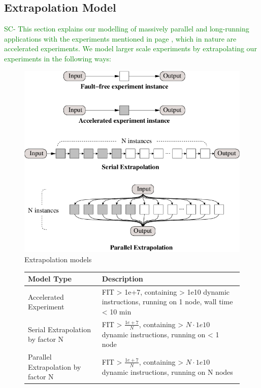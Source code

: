 \documentclass{sig-alternate}
\newcommand{\sui}[1]{%
  \textcolor{green}{SC-#1}
}
\begin{document}
{\subsection{Extrapolation Model}
\label{sec:eval:extrapolation}
\sui{
This section explains our modelling of massively parallel and long-running applications with the experiments mentioned in page \pageref{sec:eval}, which in nature
are accelerated experiments. We model larger scale experiments by extrapolating our experiments in the following ways:\\
}


\begin{figure}[ht!]
\centering
\includegraphics[width=1.00\columnwidth]{figs/extrapolates.png}
\caption{Extrapolation models}
\label{fig:extrapolations}
\end{figure}

\begin{figure}[ht!]
\centering
\begin{tabular}{|p{1.0in}|p{2.0in}|}
\hline
 Model Type & Description \\
\hline
Accelerated Experiment & FIT > 1e+7, containing > 1e10 dynamic instructions, running on 1 node, wall time < 10 min \\
\hline
Serial Extrapolation by factor N & FIT > $\frac{1e+7}{N}$, containing > $N \cdot 1e10$ dynamic instructions, running on < 1 node \\
\hline
Parallel Extrapolation by factor N & FIT > $\frac{1e+7}{N}$, containing > $N \cdot 1e10$ dynamic instructions, running on N nodes \\
\hline
\end{tabular}
\end{figure}

}
\end{document}

